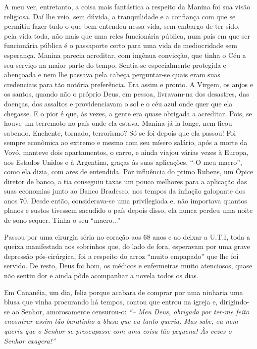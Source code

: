A meu ver, entretanto, a coisa mais fantástica a respeito da Manina foi sua visão religiosa.
Daí lhe veio, sem dúvida, a tranquilidade e a confiança com que se permitiu fazer tudo o que bem entendeu nessa vida, sem embargo de ter sido, pela vida toda, não mais que uma reles funcionária pública, num país em que ser funcionária pública é o passaporte certo para uma vida de mediocridade sem esperança.
Manina parecia acreditar, com ingênua convicção, que tinha o Céu a seu serviço na maior parte do tempo.
Sentia-se especialmente protegida e abençoada e nem lhe passava pela cabeça perguntar-se quais eram suas credenciais para tão notória preferência.
Era assim e pronto.
A Virgem, os anjos e os santos, quando não o próprio Deus, em pessoa, livravam-na dos desastres, das doenças, dos assaltos e providenciavam o sol e o céu azul onde quer que ela chegasse.
E o pior é que, às vezes, a gente era quase obrigada a acreditar.
Pois, se houve um terremoto no país onde ela estava, Manina já ia longe, nem ficou sabendo.
Enchente, tornado, terrorismo? Só se foi depois que ela passou! Foi sempre econômica ao extremo e mesmo com seu mísero salário, após a morte da Vovó, manteve dois apartamentos, o carro, e ainda viajou várias vezes à Europa, aos Estados Unidos e à Argentina, graças às suas aplicações.
``-O meu macro'', como ela dizia, com ares de entendida.
Por influência do primo Rubens, um Ópice diretor de banco, a tia conseguiu taxas um pouco melhores para a aplicação das suas economias junto ao Banco Bradesco, nos tempos da inflação galopante dos anos 70.
Desde então, considerava-se uma privilegiada e, não importava quantos planos e sustos tivessem sacudido o país depois disso, ela nunca perdeu uma noite de sono sequer.
Tinha o seu ``macro...''

Passou por uma cirurgia séria no coração aos 68 anos e ao deixar a U.T.I, toda a queixa manifestada aos sobrinhos que, do lado de fora, esperavam por uma grave depressão pós-cirúrgica, foi a respeito do arroz ``muito empapado'' que lhe foi servido.
De resto, Deus foi bom, os médicos e enfermeiras muito atenciosos, quase não sentiu dor e ainda pôde acompanhar a novela todos os dias.

Em Cananéia, um dia, feliz porque acabara de comprar por uma ninharia uma blusa que vinha procurando há tempos, contou que entrou na igreja e, dirigindo-se ao Senhor, amorosamente censurou-o: 
{\itshape``-- Meu Deus, obrigada por ter-me feito encontrar assim tão baratinho a blusa que eu tanto queria.
Mas sabe, eu nem queria que o Senhor se preocupasse com uma coisa tão pequena! Às vezes o Senhor exagera!''}

